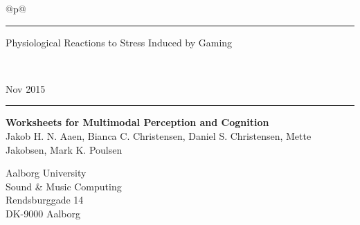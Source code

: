 \def\navnA{Jakob H. N. Aaen}\def\navnB{Bianca C. Christensen}\def\navnC{Daniel S. Christensen}\def\navnD{Mette Jakobsen}\def\navnE{Mark K. Poulsen}
\def\ptitle{Physiological Reactions to Stress Induced by Gaming}
\thispagestyle{empty}
\noindent%
\begin{tabular}{@{}p{\textwidth}@{}}
    \rule{\linewidth}{2mm}\vspace{1.5cm}
    \vspace*{-15mm}
    \begin{flushleft}
        \linespread{0.7}
        \fontsize{50}{60}\selectfont\sffamily
			\ptitle
    \end{flushleft} \\[5mm] 
    \raggedright{
        \fontsize{30}{40}\selectfont\sffamily
        Nov 2015\\ \vspace*{1mm}
    }
    \rule{\linewidth}{.7mm}
\end{tabular}
\begin{flushleft}
  {\Huge\sffamily\bfseries
      	Worksheets for Multimodal Perception and Cognition
  }\\
  \vspace{0.2cm}
  {\LARGE\sffamily
	    \navnA, \navnB, \navnC, \navnD, \navnE
  }
\end{flushleft}
\vfill
\begin{flushleft}\sffamily\large
  Aalborg University\\
  Sound \& Music Computing\\
  Rendsburggade 14\\
  DK-9000 Aalborg
\end{flushleft}
